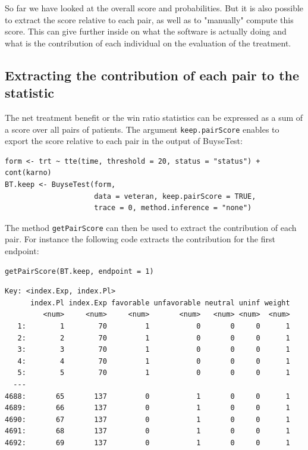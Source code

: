 \documentclass[12pt]{article}
\begin{document}
So far we have looked at the overall score and probabilities. But it
is also possible to extract the score relative to each pair, as well
as to "manually" compute this score. This can give further inside on
what the software is actually doing and what is the contribution of
each individual on the evaluation of the treatment.

\subsection{Extracting the contribution of each pair to the statistic}
\label{sec:orgdbb105e}
The net treatment benefit or the win ratio statistics can be expressed as a sum
of a score over all pairs of patients. The argument \texttt{keep.pairScore}
enables to export the score relative to each pair in the output of
BuyseTest:
\lstset{language=r,label= ,caption= ,captionpos=b,numbers=none}
\begin{lstlisting}
form <- trt ~ tte(time, threshold = 20, status = "status") + cont(karno)
BT.keep <- BuyseTest(form,
                     data = veteran, keep.pairScore = TRUE, 
                     trace = 0, method.inference = "none")
\end{lstlisting}

The method \texttt{getPairScore} can then be used to extract the contribution
of each pair. For instance the following code extracts the
contribution for the first endpoint:
\lstset{language=r,label= ,caption= ,captionpos=b,numbers=none}
\begin{lstlisting}
getPairScore(BT.keep, endpoint = 1)
\end{lstlisting}

\begin{verbatim}
Key: <index.Exp, index.Pl>
      index.Pl index.Exp favorable unfavorable neutral uninf weight
         <num>     <num>     <num>       <num>   <num> <num>  <num>
   1:        1        70         1           0       0     0      1
   2:        2        70         1           0       0     0      1
   3:        3        70         1           0       0     0      1
   4:        4        70         1           0       0     0      1
   5:        5        70         1           0       0     0      1
  ---                                                              
4688:       65       137         0           1       0     0      1
4689:       66       137         0           1       0     0      1
4690:       67       137         0           1       0     0      1
4691:       68       137         0           1       0     0      1
4692:       69       137         0           1       0     0      1
\end{verbatim}
\end{document}
